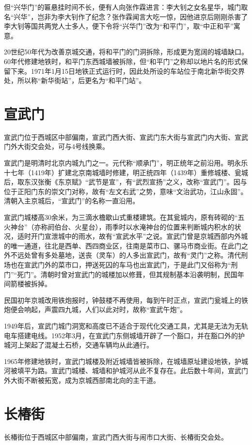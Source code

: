 但“兴华门”的匾悬挂时间不长，便有人向张作霖进言：李大钊之女名星华，城门取名“兴华”，岂非为李大钊作了纪念？张作霖闻言大吃一惊，因他进京后刚刚杀害了李大钊等国共两党人士多人，便下令将“兴华门”改为“和平门”，取“中正和平”寓意。

20世纪50年代为改善京城交通，将和平门的门洞拆除，形成更为宽阔的城墙缺口。60年代修建地铁时，和平门东西城墙被拆除，但“和平门”之称却以地片名的形式保留下来。1971年1月15日地铁正式运行时，因此处所设的车站位于南北新华街交界处，所以称“新华街站”，后更名为“和平门站”。

\section{宣武门}
宣武门位于西城区中部偏南，宣武门西大街、宣武门东大街与宣武门内大街、宣武门外大街交会处，可与4号线换乘。

宣武门是明清时北京内城九门之一。元代称“顺承门”，明正统年之前沿用。明永乐十七年（1419年）扩建北京南城墙时修建，明正统四年（1439年）重修城楼、瓮城后，取东汉张衡《东京赋》“武节是宣”，有“武烈宣扬”之义，改称“宣武门”。因与位于正阳门东的崇文门对称，故有“左文右武”之势，意味“文治武功，江山永固”。清朝入主京城后，“宣武门”的名称一直沿用。

宣武门城楼高30余米，为三滴水檐歇山式重楼建筑。在其瓮城内，原有砖砌的“五火神台”（亦称阏伯台、火星台），雨季时以水淹神台的位置来判断城内积水的状况，适时开门宣泄城中的雨水，故有“宣武水平”之说。宣武门曾是京城西部内外城的唯一通道，往北是西单、西四商业区，往南是菜市口、骡马市商业街。在此门之外不远处曾有多处墓地，送丧（灵车）的人多出宣武门，故有“灵门”之称。清代刑场也在宣武门外的菜市口，押送死囚的车马也出宣武门，于是此门又俗称为“刑门”“死门”。清朝时曾对宣武门的城楼加以修葺，但其规制基本沿袭明制，民国年间箭楼被拆掉。

民国初年京城改用铁炮报时，钟鼓楼不再使用，每到午时正点，宣武门瓮城上的铁炮便会响起，声震四九城，人们以此对时，故称“宣武午炮”。

1949年后，宣武门城门洞宽和高度已不适合于现代化交通工具，尤其是无法为无轨电车搭建电线。1952年3月，在宣武门东侧城墙开辟了一个豁口，并在豁口外的护城河上架起了混凝土石桥，交通车辆均从此通行。

1965年修建地铁时，宣武门城楼及附近城墙皆被拆除，在城墙原址建设地铁，护城河被填平为路。宣武门城楼、城墙和护城河从此不复存在。此后数十年间，宣武门外大街不断被拓宽，成为京城西部南北向的主干道。

\section{长椿街}
长椿街位于西城区中部偏南，宣武门西大街与闹市口大街、长椿街交会处。

